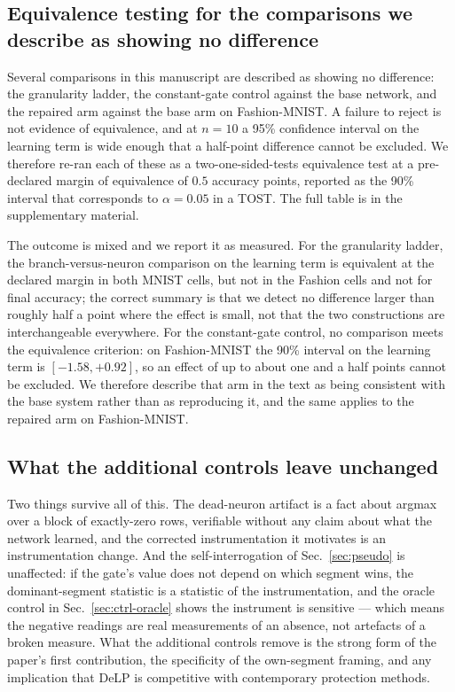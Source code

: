 \documentclass[10pt]{article}
\begin{document}
\subsection{Equivalence testing for the comparisons we describe as
showing no difference}
\label{sec:ctrl-tost}

Several comparisons in this manuscript are described as showing no
difference: the granularity ladder, the constant-gate control against the
base network, and the repaired arm against the base arm on
Fashion-MNIST. A failure to reject is not evidence of equivalence, and at
$n=10$ a 95\% confidence interval on the learning term is wide enough
that a half-point difference cannot be excluded. We therefore re-ran each
of these as a two-one-sided-tests equivalence test at a pre-declared
margin of equivalence of $0.5$ accuracy points, reported as the 90\%
interval that corresponds to $\alpha=0.05$ in a TOST. The full table is
in the supplementary material.

The outcome is mixed and we report it as measured. For the granularity
ladder, the branch-versus-neuron comparison on the learning term is
equivalent at the declared margin in both MNIST cells, but not in the
Fashion cells and not for final accuracy; the correct summary is that we
detect no difference larger than roughly half a point where the effect
is small, not that the two constructions are interchangeable everywhere.
For the constant-gate control, no comparison meets the equivalence
criterion: on Fashion-MNIST the 90\% interval on the learning term is
$[-1.58,+0.92]$, so an effect of up to about one and a half points cannot
be excluded. We therefore describe that arm in the text as being
consistent with the base system rather than as reproducing it, and the
same applies to the repaired arm on Fashion-MNIST.

\subsection{What the additional controls leave unchanged}
\label{sec:ctrl-unchanged}

Two things survive all of this. The dead-neuron artifact is a fact about
argmax over a block of exactly-zero rows, verifiable without any claim
about what the network learned, and the corrected instrumentation it
motivates is an instrumentation change. And the self-interrogation of
Sec.~\ref{sec:pseudo} is unaffected: if the gate's value does not depend
on which segment wins, the dominant-segment statistic is a statistic of
the instrumentation, and the oracle control in Sec.~\ref{sec:ctrl-oracle}
shows the instrument is sensitive --- which means the negative readings
are real measurements of an absence, not artefacts of a broken measure.
What the additional controls remove is the strong form of the paper's
first contribution, the specificity of the own-segment framing, and any
implication that DeLP is competitive with contemporary protection
methods.
\end{document}
